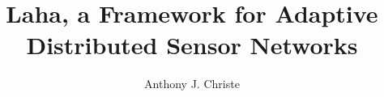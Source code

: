 \documentclass[11pt]{uhthesis}
\title{Laha, a Framework for Adaptive Distributed Sensor Networks}
\author{Anthony J. Christe}
\begin{document}
\maketitle

\begin{frontmatter}


\copyrightpage







\tableofcontents

\listoftables

\listoffigures

\end{frontmatter}







\appendix



\nocite{*}



%
\end{document}
